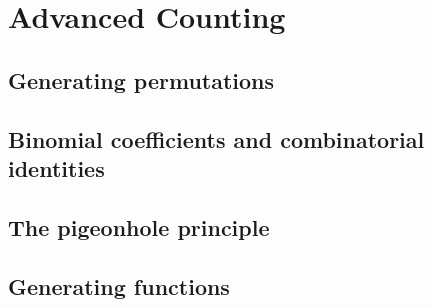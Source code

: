 \section{Advanced Counting}
\subsection{Generating permutations}
\subsection{Binomial coefficients and combinatorial identities}
\subsection{The pigeonhole principle}
\subsection{Generating functions}